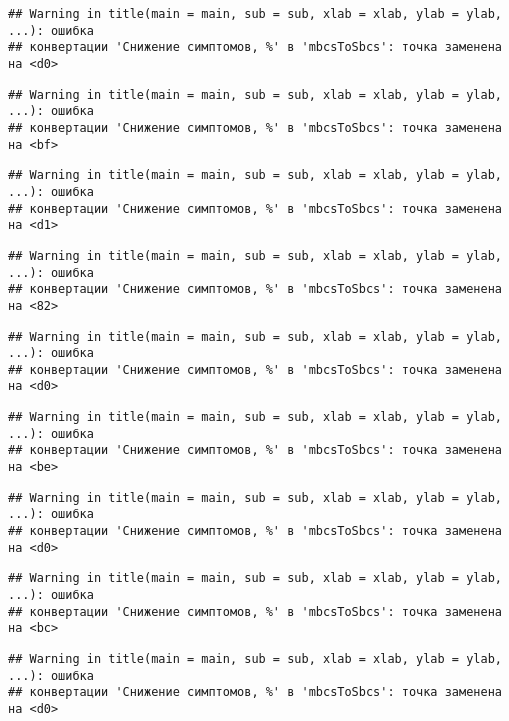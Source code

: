 \documentclass[
]{article}
\begin{document}
\begin{verbatim}
## Warning in title(main = main, sub = sub, xlab = xlab, ylab = ylab, ...): ошибка
## конвертации 'Снижение симптомов, %' в 'mbcsToSbcs': точка заменена на <d0>
\end{verbatim}

\begin{verbatim}
## Warning in title(main = main, sub = sub, xlab = xlab, ylab = ylab, ...): ошибка
## конвертации 'Снижение симптомов, %' в 'mbcsToSbcs': точка заменена на <bf>
\end{verbatim}

\begin{verbatim}
## Warning in title(main = main, sub = sub, xlab = xlab, ylab = ylab, ...): ошибка
## конвертации 'Снижение симптомов, %' в 'mbcsToSbcs': точка заменена на <d1>
\end{verbatim}

\begin{verbatim}
## Warning in title(main = main, sub = sub, xlab = xlab, ylab = ylab, ...): ошибка
## конвертации 'Снижение симптомов, %' в 'mbcsToSbcs': точка заменена на <82>
\end{verbatim}

\begin{verbatim}
## Warning in title(main = main, sub = sub, xlab = xlab, ylab = ylab, ...): ошибка
## конвертации 'Снижение симптомов, %' в 'mbcsToSbcs': точка заменена на <d0>
\end{verbatim}

\begin{verbatim}
## Warning in title(main = main, sub = sub, xlab = xlab, ylab = ylab, ...): ошибка
## конвертации 'Снижение симптомов, %' в 'mbcsToSbcs': точка заменена на <be>
\end{verbatim}

\begin{verbatim}
## Warning in title(main = main, sub = sub, xlab = xlab, ylab = ylab, ...): ошибка
## конвертации 'Снижение симптомов, %' в 'mbcsToSbcs': точка заменена на <d0>
\end{verbatim}

\begin{verbatim}
## Warning in title(main = main, sub = sub, xlab = xlab, ylab = ylab, ...): ошибка
## конвертации 'Снижение симптомов, %' в 'mbcsToSbcs': точка заменена на <bc>
\end{verbatim}

\begin{verbatim}
## Warning in title(main = main, sub = sub, xlab = xlab, ylab = ylab, ...): ошибка
## конвертации 'Снижение симптомов, %' в 'mbcsToSbcs': точка заменена на <d0>
\end{verbatim}
\end{document}
